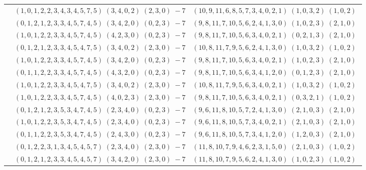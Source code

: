 \documentclass[11pt]{article}
\begin{document}
\begin{longtable}[l]{|c|c|c|}
 \cline{2-3} 
 & $(1 ,0 ,1 ,2 ,2 ,3 ,4 ,3 ,4 ,5 ,7 ,5) \;(3 ,4 ,0 ,2) \;(2 ,3 ,0) \;-7$ & $(10 ,9 ,11 ,6 ,8 ,5 ,7 ,3 ,4 ,0 ,2 ,1) \;(1 ,0 ,3 ,2) \;(1 ,0 ,2) \;$\\ 
 \cline{2-3} 
 & $(0 ,1 ,2 ,1 ,2 ,3 ,3 ,4 ,5 ,7 ,4 ,5) \;(3 ,4 ,2 ,0) \;(0 ,2 ,3) \;-7$ & $(9 ,8 ,11 ,7 ,10 ,5 ,6 ,2 ,4 ,1 ,3 ,0) \;(1 ,0 ,2 ,3) \;(2 ,1 ,0) \;$\\ 
 \cline{2-3} 
 & $(1 ,0 ,1 ,2 ,2 ,3 ,3 ,4 ,5 ,7 ,4 ,5) \;(4 ,2 ,3 ,0) \;(0 ,2 ,3) \;-7$ & $(9 ,8 ,11 ,7 ,10 ,5 ,6 ,3 ,4 ,0 ,2 ,1) \;(0 ,2 ,1 ,3) \;(2 ,1 ,0) \;$\\ 
 \cline{2-3} 
 & $(0 ,1 ,2 ,1 ,2 ,3 ,3 ,4 ,5 ,4 ,7 ,5) \;(3 ,4 ,0 ,2) \;(2 ,3 ,0) \;-7$ & $(10 ,8 ,11 ,7 ,9 ,5 ,6 ,2 ,4 ,1 ,3 ,0) \;(1 ,0 ,3 ,2) \;(1 ,0 ,2) \;$\\ 
 \cline{2-3} 
 & $(1 ,0 ,1 ,2 ,2 ,3 ,3 ,4 ,5 ,7 ,4 ,5) \;(3 ,4 ,2 ,0) \;(0 ,2 ,3) \;-7$ & $(9 ,8 ,11 ,7 ,10 ,5 ,6 ,3 ,4 ,0 ,2 ,1) \;(1 ,0 ,2 ,3) \;(2 ,1 ,0) \;$\\ 
 \cline{2-3} 
 & $(0 ,1 ,1 ,2 ,2 ,3 ,3 ,4 ,5 ,7 ,4 ,5) \;(4 ,3 ,2 ,0) \;(0 ,2 ,3) \;-7$ & $(9 ,8 ,11 ,7 ,10 ,5 ,6 ,3 ,4 ,1 ,2 ,0) \;(0 ,1 ,2 ,3) \;(2 ,1 ,0) \;$\\ 
 \cline{2-3} 
 & $(1 ,0 ,1 ,2 ,2 ,3 ,3 ,4 ,5 ,4 ,7 ,5) \;(3 ,4 ,0 ,2) \;(2 ,3 ,0) \;-7$ & $(10 ,8 ,11 ,7 ,9 ,5 ,6 ,3 ,4 ,0 ,2 ,1) \;(1 ,0 ,3 ,2) \;(1 ,0 ,2) \;$\\ 
 \cline{2-3} 
 & $(1 ,0 ,1 ,2 ,2 ,3 ,3 ,4 ,5 ,7 ,4 ,5) \;(4 ,0 ,2 ,3) \;(2 ,3 ,0) \;-7$ & $(9 ,8 ,11 ,7 ,10 ,5 ,6 ,3 ,4 ,0 ,2 ,1) \;(0 ,3 ,2 ,1) \;(1 ,0 ,2) \;$\\ 
 \cline{2-3} 
 & $(0 ,1 ,2 ,1 ,2 ,3 ,5 ,3 ,4 ,7 ,4 ,5) \;(2 ,3 ,4 ,0) \;(0 ,2 ,3) \;-7$ & $(9 ,6 ,11 ,8 ,10 ,5 ,7 ,2 ,4 ,1 ,3 ,0) \;(2 ,1 ,0 ,3) \;(2 ,1 ,0) \;$\\ 
 \cline{2-3} 
 & $(1 ,0 ,1 ,2 ,2 ,3 ,5 ,3 ,4 ,7 ,4 ,5) \;(2 ,3 ,4 ,0) \;(0 ,2 ,3) \;-7$ & $(9 ,6 ,11 ,8 ,10 ,5 ,7 ,3 ,4 ,0 ,2 ,1) \;(2 ,1 ,0 ,3) \;(2 ,1 ,0) \;$\\ 
 \cline{2-3} 
 & $(0 ,1 ,1 ,2 ,2 ,3 ,5 ,3 ,4 ,7 ,4 ,5) \;(2 ,4 ,3 ,0) \;(0 ,2 ,3) \;-7$ & $(9 ,6 ,11 ,8 ,10 ,5 ,7 ,3 ,4 ,1 ,2 ,0) \;(1 ,2 ,0 ,3) \;(2 ,1 ,0) \;$\\ 
 \cline{2-3} 
 & $(0 ,1 ,2 ,2 ,3 ,1 ,3 ,4 ,5 ,4 ,5 ,7) \;(2 ,3 ,4 ,0) \;(2 ,3 ,0) \;-7$ & $(11 ,8 ,10 ,7 ,9 ,4 ,6 ,2 ,3 ,1 ,5 ,0) \;(2 ,1 ,0 ,3) \;(1 ,0 ,2) \;$\\ 
 \cline{2-3} 
 & $(0 ,1 ,2 ,1 ,2 ,3 ,3 ,4 ,5 ,4 ,5 ,7) \;(3 ,4 ,2 ,0) \;(2 ,3 ,0) \;-7$ & $(11 ,8 ,10 ,7 ,9 ,5 ,6 ,2 ,4 ,1 ,3 ,0) \;(1 ,0 ,2 ,3) \;(1 ,0 ,2) \;$\\ 

\end{longtable}
\end{document}
